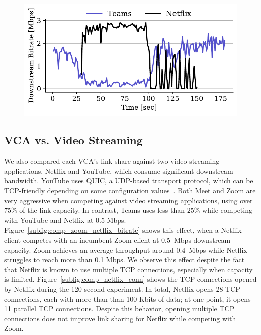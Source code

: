 \begin{figure}[t!]
\centering
\includegraphics[width=\linewidth]{figures/comp_ts/teams_netflix_3_dl_r3.pdf}
\label{subfig:netflix-teams}
\caption{}
\label{fig:comp_netflix_zoom_teams}
\end{figure}


\subsection{VCA vs. Video Streaming}

We also compared each VCA's link share against two video streaming
applications, Netflix and YouTube,
which consume significant downstream bandwidth. 
YouTube uses QUIC, a UDP-based transport protocol,
which can be TCP-friendly depending on some configuration values~\cite{corbel2019assessing}. 
Both Meet and Zoom are
very aggressive when competing against video streaming applications, using
over $75\%$ of the link capacity. In contrast, Teams uses
less than $25\%$ while competing with YouTube and Netflix at 0.5 Mbps.  
Figure~\ref{subfig:comp_zoom_netflix_bitrate} shows this effect, when a
Netflix client competes with an incumbent Zoom client at 0.5~Mbps downstream
capacity. Zoom achieves an average throughput around 0.4~Mbps while
Netflix struggles to reach more than 0.1 Mbps. We observe this effect despite
the fact that Netflix is
known to use multiple TCP connections, especially when capacity is limited.
Figure~\ref{subfig:comp_netflix_conn} shows the TCP connections
opened by Netflix during the 120-second experiment. In total, Netflix opens 28
TCP connections, each with more than than 100 Kbits of data; at one point, it
opens 11 parallel TCP
connections. Despite this behavior, opening multiple TCP connections
does not improve link sharing for Netflix while competing with Zoom. 

